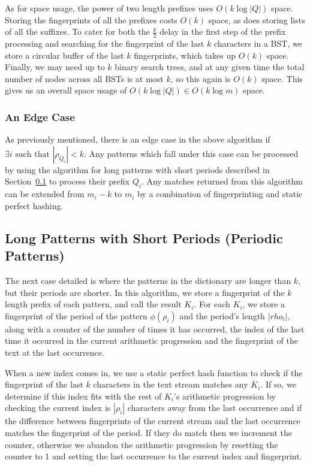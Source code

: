\documentclass[ %
                    author={Dominic Joseph Moylett},
                    degree={MEng},
                     title={Dictionary Matching with Fingerprints},
                  subtitle={An Empirical Analysis},
                      type={research},
                      year={2015} ]{dissertation}
\begin{document}
As for space usage, the power of two length prefixes uses $O(k\log|Q|)$ space. Storing the fingerprints of all the prefixes costs $O(k)$ space, as does storing lists of all the suffixes. To cater for both the $\frac{k}{2}$ delay in the first step of the prefix processing and searching for the fingerprint of the last $k$ characters in a BST, we store a circular buffer of the last $k$ fingerprints, which takes up $O(k)$ space. Finally, we may need up to $k$ binary search trees, and at any given time the total number of nodes across all BSTs is at most $k$, so this again is $O(k)$ space. This gives us an overall space usage of $O(k\log|Q|) \in O(k\log m)$ space.

\subsubsection{An Edge Case}
\label{sssec:edge-case-theory}

As previously mentioned, there is an edge case in the above algorithm if $\exists i \text{ such that } |\rho_{Q_i}| < k$. Any patterns which fall under this case can be processed by using the algorithm for long patterns with short periods described in Section~\ref{ssec:periodic-theory} to process their prefix $Q_i$. Any matches returned from this algorithm can be extended from $m_i - k$ to $m_i$ by a combination of fingerprinting and static perfect hashing.

\subsection{Long Patterns with Short Periods (Periodic Patterns)}
\label{ssec:periodic-theory}

The next case detailed is where the patterns in the dictionary are longer than $k$, but their periods are shorter. In this algorithm, we store a fingerprint of the $k$ length prefix of each pattern, and call the result $K_i$. For each $K_i$, we store a fingerprint of the period of the pattern $\phi(\rho_i)$ and the period's length $|rho_i|$, along with a counter of the number of times it has occurred, the index of the last time it occurred in the current arithmetic progression and the fingerprint of the text at the last occurrence.

When a new index comes in, we use a static perfect hash function to check if the fingerprint of the last $k$ characters in the text stream matches any $K_i$. If so, we determine if this index fits with the rest of $K_i$'s arithmetic progression by checking the current index is $|\rho_i|$ characters away from the last occurrence and if the difference between fingerprints of the current stream and the last occurrence matches the fingerprint of the period. If they do match then we increment the counter, otherwise we abandon the arithmetic progression by resetting the counter to 1 and setting the last occurrence to the current index and fingerprint.
\end{document}
